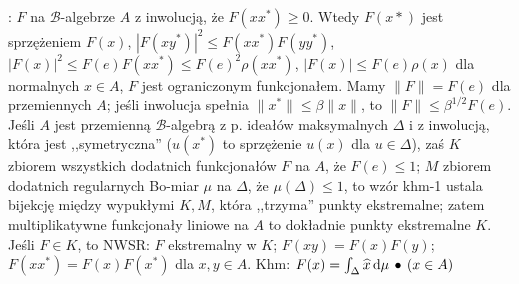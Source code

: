:  $F$ na $\mathscr B$-algebrze $A$ z inwolucją, że $F(x x^*) \ge 0$.
Wtedy $F(x*)$ jest sprzężeniem $F(x)$, $|F(xy^*)|^2 \le F(xx^*) F(yy^*)$,  $|F(x)|^2 \le F(e) F(xx^*) \le F(e)^2 \rho(xx^*)$, $|F(x)| \le F(e) \rho(x)$ dla normalnych $x \in A$, $F$ jest ograniczonym funkcjonałem.
Mamy  $\|F\| = F(e)$ dla przemiennych $A$; jeśli inwolucja spełnia $\|x^*\| \le \beta \|x\|$, to $\|F\| \le \beta^{1/2} F(e)$.
Jeśli $A$ jest przemienną $\mathscr B$-algebrą z p. ideałów maksymalnych $\Delta$ i z inwolucją, która jest ,,symetryczna'' ($u(x^*)$ to sprzężenie ${u(x)}$ dla $u \in \Delta$), zaś $K$ zbiorem wszystkich dodatnich funkcjonałów $F$ na $A$, że $F(e) \le 1$; $M$ zbiorem dodatnich regularnych Bo-miar $\mu$ na $\Delta$, że $\mu(\Delta) \le 1$, to wzór khm-1 ustala bijekcję między wypukłymi $K, M$, która ,,trzyma'' punkty ekstremalne; zatem multiplikatywne funkcjonały liniowe na $A$ to dokładnie punkty ekstremalne $K$.
Jeśli $F \in K$, to NWSR: $F$ ekstremalny w $K$; $F(xy) = F(x)F(y)$; $F(xx^*) = F(x)F(x^*)$ dla $x, y \in A$.
\hfill Khm: $F(x) = \int_\Delta \widehat{x} \,\textrm{d}\mu \, \bullet \, (x \in A)$